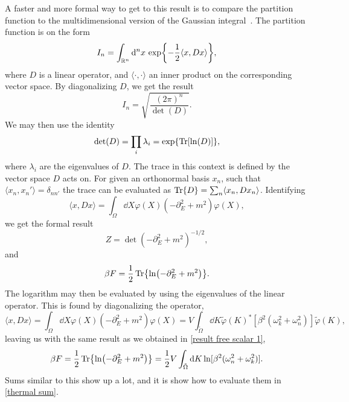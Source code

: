 A faster and more formal way to get to this result is to compare the partition function to the multidimensional version of the Gaussian integral~\cite{Kapusta:finiteTemp, Peskin:IntroQFT}.
The partition function is on the form 
\begin{equation*}
    I_n = \int_{\mathbb{R}^n} \dd^n x\, \exp{- \frac{1}{2} \langle x, D x\rangle },
\end{equation*}
where $D$ is a linear operator, and $\langle \cdot , \cdot \rangle$ an inner product on the corresponding vector space.
By diagonalizing $D$, we get the result
\begin{equation*}
    I_n = \sqrt{\frac{(2 \pi)^n}{\det(D)}}.
\end{equation*}
We may then use the identity
\begin{equation}
    \label{lndettrln}
    \det(D) = \prod_i \lambda_i = \exp{\Tr[\ln(D)]},
\end{equation}
where $\lambda_i$ are the eigenvalues of $D$.
The trace in this context is defined by the vector space $D$ acts on.
For given an orthonormal basis $x_n$, such that $\langle x_n, x_n'\rangle = \delta_{nn'}$ the trace can be evaluated as $\Tr{D} = \sum_n \langle x_n, D x_n \rangle$.
Identifying 
\begin{equation*}
    \langle x, D x\rangle = \int_\Omega \dd X \varphi(X)\left(-\partial_E^2+m^2\right)\varphi(X),
\end{equation*}
we get the formal result
\begin{equation*}
    Z = \det(-\partial_E^2 + m^2)^{-1/2},
\end{equation*}
and 
\begin{equation*}
    \beta F = \frac{1}{2}\Tr{\ln(-\partial_E^2 + m^2)}.
\end{equation*}
The logarithm may then be evaluated by using the eigenvalues of the linear operator.
This is found by diagonalizing the operator,
\begin{equation*}
    \langle x, D x \rangle 
    = \int_\Omega \dd X \varphi(X)\left(-\partial_E^2+m^2\right)\varphi(X)
    = V  \int_{\tilde \Omega} \dd K 
    \tilde \varphi(K)^* [\beta^2(\omega_k^2 +\omega_n^2)] \tilde \varphi(K),
\end{equation*}
leaving us with the same result as we obtained in \autoref{result free scalar 1},
\begin{equation*}
    \beta F 
    = \frac{1}{2} \Tr{\ln(-\partial_E^2 + m^2)} 
    = \frac{1}{2} V \int_{\tilde \Omega} \dd K \ln[\beta^2(\omega_n^2 + \omega_k^2)].
\end{equation*}
Sums similar to this show up a lot, and it is show how to evaluate them in \autoref{thermal sum}.
